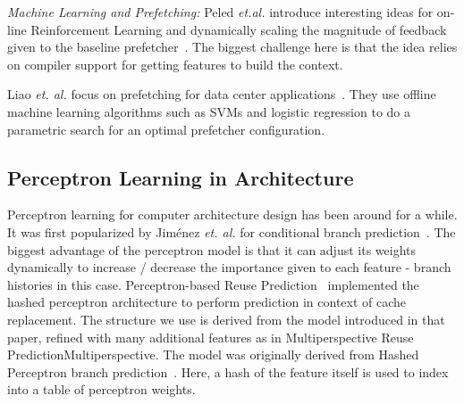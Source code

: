 \textit{Machine Learning and Prefetching:} Peled \textit{et.al.} introduce
interesting ideas for on-line Reinforcement Learning and dynamically scaling
the magnitude of feedback given to the baseline prefetcher~\cite{Semantics}.
The biggest challenge here is that the idea relies on compiler support for
getting features to build the context.

Liao \textit{et. al.} focus on prefetching for data center
applications~\cite{Datacenter}. They use offline machine learning algorithms
such as SVMs and logistic regression to do a parametric search for an optimal
prefetcher configuration.



\subsection{Perceptron Learning in Architecture}
\label{Background-Perceptron}
Perceptron learning for computer architecture design has been around for a
while.  It was first popularized by Jim\'enez \textit{et. al.} for conditional
branch prediction~\cite{Perc_Branch}. The biggest advantage of the perceptron
model is that it can adjust its weights dynamically to increase / decrease the
importance given to each feature - branch histories in this case.  
Perceptron-based Reuse Prediction~\cite{Perc_Reuse} implemented the hashed
perceptron architecture to perform prediction in context of cache replacement.
The structure  we use is derived from the model introduced in that paper, refined with 
many additional features as in Multiperspective Reuse Prediction{Multiperspective}.  
The model was originally derived from Hashed Perceptron branch 
prediction~\cite{HashedPerceptron}.  Here, a hash of the feature itself is used to 
index into a table of perceptron weights.

